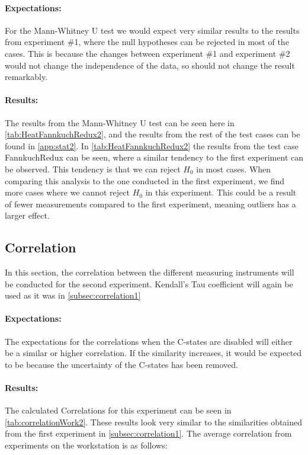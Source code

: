 \paragraph{Expectations:} For the Mann-Whitney U test we would expect very similar results to the results from experiment \#1, where the null hypotheses can be rejected in most of the cases. This is because the changes between experiment \#1 and experiment \#2 would not change the independence of the data, so should not change the result remarkably.



\paragraph{Results:} The results from the Mann-Whitney U test can be seen here in \cref{tab:HeatFannkuchRedux2}, and the results from the rest of the test cases can be found in \cref{app:stat2}. In \cref{tab:HeatFannkuchRedux2} the results from the test case FannkuchRedux can be seen, where a similar tendency to the first experiment can be observed. This tendency is that we can reject $H_0$ in most cases. When comparing this analysis to the one conducted in the first experiment, we find more cases where we cannot reject $H_0$ in this experiment. This could be a result of fewer measurements compared to the first experiment, meaning outliers has a larger effect.

\subsection{Correlation}\label{subsec:correlation2}
In this section, the correlation between the different measuring instruments will be conducted for the second experiment. Kendall's Tau coefficient\cite{kendall1938new} will again be used as it was in \cref{subsec:correlation1}

\paragraph{Expectations:} The expectations for the correlations when the C-states are disabled will either be a similar or higher correlation. If the similarity increases, it would be expected to be because the uncertainty of the C-states has been removed.



\paragraph{Results:} The calculated Correlations for this experiment can be seen in \cref{tab:correlationWork2}. These results look very similar to the similarities obtained from the first experiment in \cref{subsec:correlation1}. The average correlation from experiments on the workstation is as follows:

